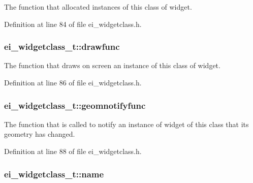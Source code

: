 The function that allocated instances of this class of widget. 



Definition at line 84 of file ei\+\_\+widgetclass.\+h.

\hypertarget{structei__widgetclass__t_a528168099a2a1515c4cf65400ccbfff2}{
\subsubsection[{drawfunc}]{ ei\+\_\+widgetclass\+\_\+t\+::drawfunc}}\label{structei__widgetclass__t_a528168099a2a1515c4cf65400ccbfff2}


The function that draws on screen an instance of this class of widget. 



Definition at line 86 of file ei\+\_\+widgetclass.\+h.

\hypertarget{structei__widgetclass__t_aaf0aa3f54a48a6b3f8b8e12574ede4b7}{
\subsubsection[{geomnotifyfunc}]{ ei\+\_\+widgetclass\+\_\+t\+::geomnotifyfunc}}\label{structei__widgetclass__t_aaf0aa3f54a48a6b3f8b8e12574ede4b7}


The function that is called to notify an instance of widget of this class that its geometry has changed. 



Definition at line 88 of file ei\+\_\+widgetclass.\+h.

\hypertarget{structei__widgetclass__t_aa5799b5999890cf04915bf0fe5151ec8}{
\subsubsection[{name}]{ ei\+\_\+widgetclass\+\_\+t\+::name}}\label{structei__widgetclass__t_aa5799b5999890cf04915bf0fe5151ec8}



